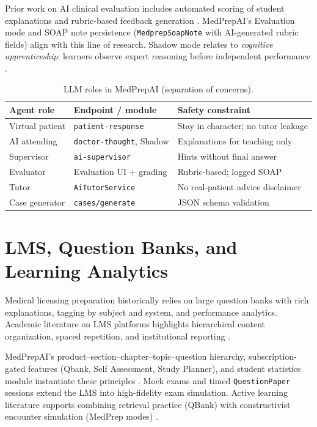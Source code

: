 Prior work on AI clinical evaluation includes automated scoring of student explanations and rubric-based feedback generation \cite{chan_gpt4_usmle_2023}. MedPrepAI's Evaluation mode and SOAP note persistence (\texttt{MedprepSoapNote} with AI-generated rubric fields) align with this line of research. Shadow mode relates to \emph{cognitive apprenticeship}: learners observe expert reasoning before independent performance \cite{collins_cognitive_1991}.

\begin{table}[htbp]
  \centering
  \caption{LLM roles in MedPrepAI (separation of concerns).}
  \label{tab:llm-roles}
  \small
  \begin{tabular}{@{}p{2.8cm}p{4.5cm}p{5.9cm}@{}}
    \toprule
    \textbf{Agent role} & \textbf{Endpoint / module} & \textbf{Safety constraint} \\
    \midrule
    Virtual patient & \texttt{patient-response} & Stay in character; no tutor leakage \\
    AI attending & \texttt{doctor-thought}, Shadow & Explanations for teaching only \\
    Supervisor & \texttt{ai-supervisor} & Hints without final answer \\
    Evaluator & Evaluation UI + grading & Rubric-based; logged SOAP \\
    Tutor & \texttt{AiTutorService} & No real-patient advice disclaimer \\
    Case generator & \texttt{cases/generate} & JSON schema validation \\
    \bottomrule
  \end{tabular}
\end{table}

\section{LMS, Question Banks, and Learning Analytics}
Medical licensing preparation historically relies on large question banks with rich explanations, tagging by subject and system, and performance analytics. Academic literature on LMS platforms highlights hierarchical content organization, spaced repetition, and institutional reporting \cite{ellis_lms_2015}.

MedPrepAI's product--section--chapter--topic--question hierarchy, subscription-gated features (Qbank, Self Assessment, Study Planner), and student statistics module instantiate these principles \cite{ellis_lms_2015,freeman_active_2014}. Mock exams and timed \texttt{QuestionPaper} sessions extend the LMS into high-fidelity exam simulation. Active learning literature supports combining retrieval practice (QBank) with constructivist encounter simulation (MedPrep modes) \cite{freeman_active_2014,kolb_experiential_1984}.

